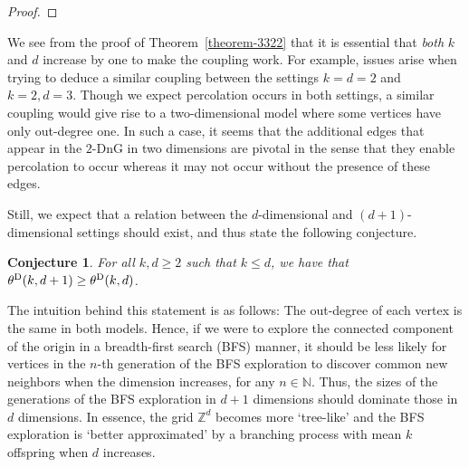 \documentclass[oneside]{amsart}
\newcommand{\N}{\mathbb{N}}
\newtheorem{conj}[theorem]{Conjecture}
\theoremstyle{definition}
\renewcommand{\P}{\mathbb{P}}
\newcommand{\1}{\mathbbm{1}}
\newcommand{\E}{\mathbb{E}}
\newcommand{\0}{\mathbf{o}}
\renewcommand{\d}{\mathrm{d}}
\newcommand{\Z}{\mathbb{Z}}
\numberwithin{equation}{section}
\begin{document}
\begin{proof}
\end{proof}

We see from the proof of Theorem~\ref{theorem-3322} that it is essential that \emph{both} $k$ and $d$ increase by one to make the coupling work. For example, issues arise when trying to deduce a similar coupling between the settings $k=d=2$ and $k=2,d=3$. Though we expect percolation occurs in both settings, a similar coupling would give rise to a two-dimensional model where some vertices have only out-degree one. In such a case, it seems that the additional edges that appear in the $2$-DnG in two dimensions are pivotal in the sense that they enable percolation to occur whereas it may not occur without the presence of these edges. 

Still, we expect that a relation between the $d$-dimensional and $(d+1)$-dimensional settings should exist, and thus state the following conjecture.

\begin{conj}\label{conj:dimensioncouple}
For all $k,d\ge 2$ such that $k\leq d$, we have that $\theta^{\rm D}(k,d+1)\geq \theta^{\rm D}(k,d)$. 
\end{conj}

The intuition behind this statement is as follows: The out-degree of each vertex is the same in both models. Hence, if we were to explore the connected component of the origin in a breadth-first search (BFS) manner, it should be less likely for vertices in the $n$-th generation of the BFS exploration to discover common new neighbors when the dimension increases, for any $n\in\N$. Thus, the sizes of the generations of the BFS exploration in $d+1$ dimensions should dominate those in $d$ dimensions. In essence, the grid $\Z^d$ becomes more `tree-like' and the BFS exploration is `better approximated' by a branching process with mean $k$ offspring when $d$ increases.
\end{document}
